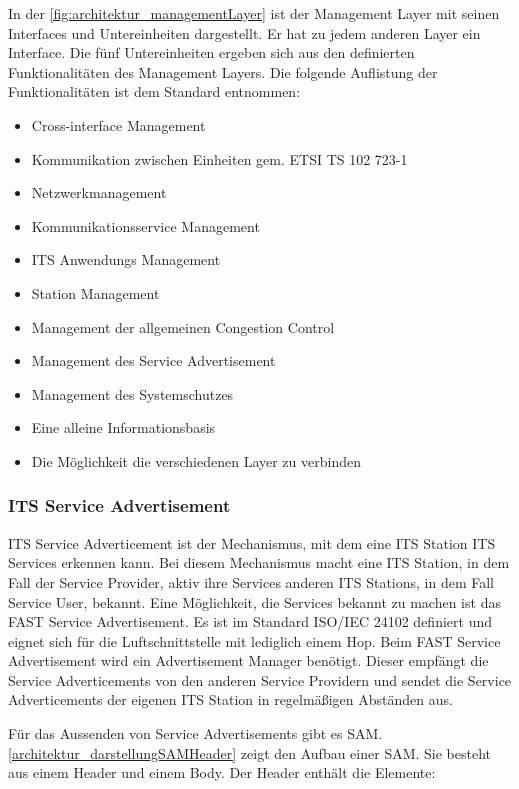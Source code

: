 In der  \autoref{fig:architektur_managementLayer} ist der Management Layer mit seinen Interfaces und Untereinheiten dargestellt. Er hat zu jedem anderen Layer ein Interface. Die fünf Untereinheiten ergeben sich aus den definierten Funktionalitäten des Management Layers. Die folgende Auflistung der Funktionalitäten ist dem Standard \cite{etsi2010302} entnommen:

\begin{itemize}
	\item Cross-interface Management
	\item Kommunikation zwischen Einheiten gem. ETSI TS 102 723-1
	\item Netzwerkmanagement
	\item Kommunikationsservice Management
	\item \ac{ITS} Anwendungs Management
	\item Station Management
	\item Management der allgemeinen Congestion Control
	\item Management des Service Advertisement
	\item Management des Systemschutzes 
	\item Eine alleine Informationsbasis
	\item Die Möglichkeit die verschiedenen Layer zu verbinden
\end{itemize}

\subsubsection{ITS Service Advertisement}
\ac{ITS} Service Adverticement ist der Mechanismus, mit dem eine \ac{ITS} Station \ac{ITS} Services erkennen kann. Bei diesem Mechanismus macht eine \ac{ITS} Station, in dem Fall der Service Provider, aktiv ihre Services anderen \ac{ITS} Stations, in dem Fall Service User, bekannt. Eine Möglichkeit, die Services bekannt zu machen ist das FAST Service Advertisement. Es ist im Standard ISO/IEC 24102 definiert und eignet sich für die Luftschnittstelle mit lediglich einem Hop. Beim FAST Service Advertisement wird ein Advertisement Manager benötigt. Dieser empfängt die Service Adverticements von den anderen Service Providern und sendet die Service Adverticements der eigenen \ac{ITS} Station in regelmäßigen Abständen aus.

Für das Aussenden von Service Advertisements gibt es \ac{SAM}. \autoref{architektur_darstellungSAMHeader} zeigt den Aufbau einer \ac{SAM}. Sie besteht aus einem Header und einem Body. Der Header enthält die Elemente:

